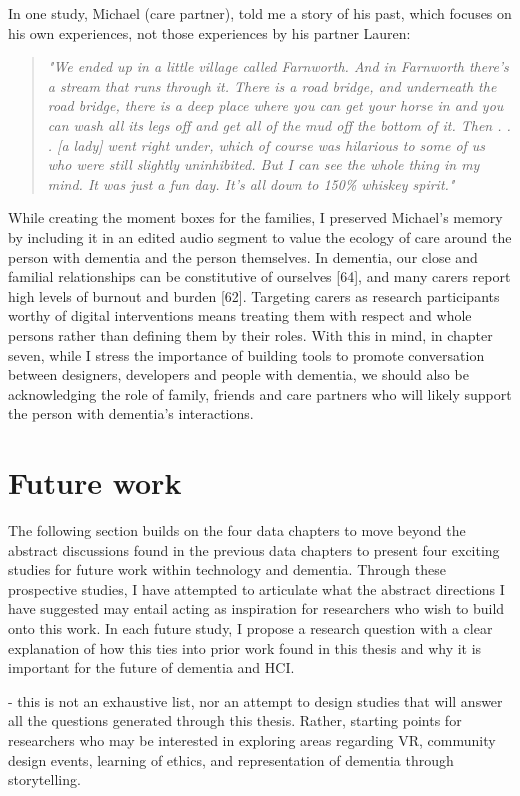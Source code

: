 In one study, Michael (care partner), told me a story of his past, which focuses on his own experiences, not those experiences by his partner Lauren:
\begin{quote}
\textit{"We ended up in a little village called Farnworth. And in Farnworth there's a stream that runs through it. There is a road bridge, and underneath the road bridge, there is a deep place where you can get your horse in and you can wash all its legs off and get all of the mud off the bottom of it. Then . . . [a lady] went right under, which of course was hilarious to some of us who were still slightly uninhibited. But I can see the whole thing in my mind. It was just a fun day. It's all down to 150\% whiskey spirit."}
\end{quote}
While creating the moment boxes for the families, I preserved Michael's memory by including it in an edited audio segment to value the ecology of care around the person with dementia and the person themselves. In dementia, our close and familial relationships can be constitutive of ourselves [64], and many carers report high levels of burnout and burden [62]. Targeting carers as research participants worthy of digital interventions means treating them with respect and whole persons rather than defining them by their roles. With this in mind, in chapter seven, while I stress the importance of building tools to promote conversation between designers, developers and people with dementia, we should also be acknowledging the role of family, friends and care partners who will likely support the person with dementia's interactions. 

\section{Future work}
\label{FutureWork}
The following section builds on the four data chapters to move beyond the abstract discussions found in the previous data chapters to present four exciting studies for future work within technology and dementia. Through these prospective studies, I have attempted to articulate what the abstract directions I have suggested may entail acting as inspiration for researchers who wish to build onto this work. In each future study, I propose a research question with a clear explanation of how this ties into prior work found in this thesis and why it is important for the future of dementia and HCI.

- this is not an exhaustive list, nor an attempt to design studies that will answer all the questions generated through this thesis. Rather, starting points for researchers who may be interested in exploring areas regarding VR, community design events, learning of ethics, and representation of dementia through storytelling. 

